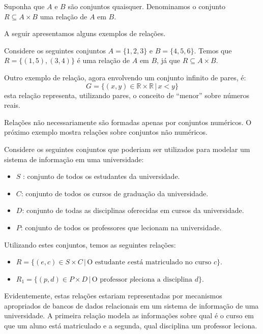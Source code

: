 \begin{Definition}[Relação]
Suponha que $A$ e $B$ são conjuntos quaisquer. Denominamos o conjunto
$R \subseteq A \times B$ uma relação de $A$ em $B$.
\end{Definition}

A seguir apresentamos alguns exemplos de relações.

\begin{Example}
Considere os seguintes conjuntos $A = \{1,2,3\}$ e $B =
\{4,5,6\}$. Temos que $R = \{(1,5),(3,4)\}$ é uma relação de $A$ em
$B$, já que $R\subseteq A \times B$.

Outro exemplo de relação, agora envolvendo um conjunto infinito de
pares, é:
\[ G = \{(x,y)\in\mathbb{R}\times\mathbb{R}\,|\,x < y\}\]
esta relação representa, utilizando pares, o conceito de ``menor''
sobre números reais.
\end{Example}

Relações não necessariamente são formadas apenas por conjuntos
numéricos. O próximo exemplo mostra relações sobre conjuntos não
numéricos.

\begin{Example}
Considere os seguintes conjuntos que poderiam ser utilizados para
modelar um sistema de informação em uma universidade:
\begin{itemize}
  \item $S$ : conjunto de todos os estudantes da universidade.
  \item $C$: conjunto de todos os cursos de graduação da universidade.
  \item $D$: conjunto de todas as disciplinas oferecidas em cursos da
    universidade.
  \item $P$: conjunto de todos os professores que lecionam na universidade.
\end{itemize}
Utilizando estes conjuntos, temos as seguintes relações:
\begin{itemize}
  \item $R = \{(e,c)\in S \times C\,|\,\text{O estudante } e\text{
      está matriculado no curso }c\}$.
  \item $R_1 =\{(p,d)\in P \times D\,|\,\text{O professor }p\text{
      leciona a disciplina }d\}$.
\end{itemize}
Evidentemente, estas relações estariam representadas por mecanismos
apropriados de bancos de dados relacionais em um sistema de informação
de uma universidade. A primeira relação modela as informações sobre
qual é o curso em que um aluno está matriculado e a segunda, qual
disciplina um professor leciona.
\end{Example}

